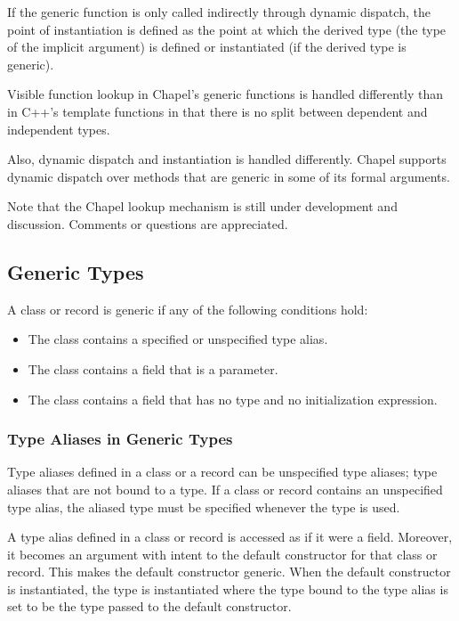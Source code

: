 If the generic function is only called indirectly through dynamic
dispatch, the point of instantiation is defined as the point at which
the derived type (the type of the implicit  argument) is
defined or instantiated (if the derived type is generic).

\begin{rationale}
Visible function lookup in Chapel's generic functions is handled
differently than in C++'s template functions in that there is no split
between dependent and independent types.

Also, dynamic dispatch and instantiation is handled differently.
Chapel supports dynamic dispatch over methods that are generic in some
of its formal arguments.

Note that the Chapel lookup mechanism is still under development and
discussion.  Comments or questions are appreciated.
\end{rationale}

\subsection{Generic Types}
\label{Generic_Types}

A class or record is generic if any of the following conditions hold:
\begin{itemize}
\item
The class contains a specified or unspecified type alias.
\item
The class contains a field that is a parameter.
\item
The class contains a field that has no type and no initialization
expression.
\end{itemize}

\subsubsection{Type Aliases in Generic Types}
\label{Type_Aliases_in_Generic_Types}

Type aliases defined in a class or a record can be unspecified type
aliases; type aliases that are not bound to a type.  If a class or
record contains an unspecified type alias, the aliased type must be
specified whenever the type is used.

A type alias defined in a class or record is accessed as if it were a
field.  Moreover, it becomes an argument with intent  to
the default constructor for that class or record.  This makes the
default constructor generic.  When the default constructor is
instantiated, the type is instantiated where the type bound to the
type alias is set to be the type passed to the default constructor.

